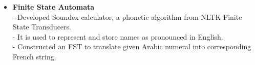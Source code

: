 \begin{itemize}

 \item \textbf{Finite State Automata} \\
 - Developed Soundex calculator, a phonetic algorithm  from NLTK Finite State Transducers.\\
 - It is used to represent and store names as pronounced in English.\\
 - Constructed an FST to translate given Arabic numeral into corresponding French string.



\end{itemize}
